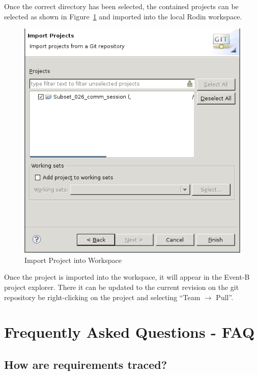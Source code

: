 \documentclass{template/openetcs_article}
\begin{document}
Once the correct directory has been selected, the contained projects can be
selected as shown in Figure~\ref{fig:import-project-workspace} and imported into
the local Rodin workspace.

\begin{figure}[H]
  \centering
  \includegraphics[width=\skalierung\textwidth]{project_import_step8}
  \caption{Import Project into Workspace}
  \label{fig:import-project-workspace}
\end{figure}

Once the project is imported into the workspace, it will appear in the Event-B
project explorer. There it can be updated to the current revision on the git
repository be right-clicking on the project and selecting ``Team $\rightarrow$
Pull''. 

\section{Frequently Asked Questions - FAQ}
\label{sec:faq}

\subsection{How are requirements traced?}
\label{sec:how-are-requirements}
\end{document}
